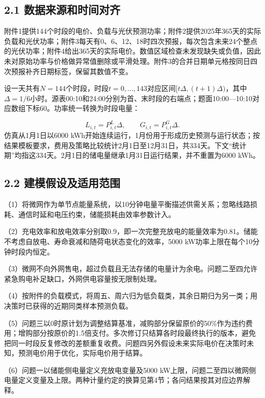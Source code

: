\documentclass[UTF8,a4paper,zihao=-4,fontset=windows]{ctexart}
\begin{document}
\subsection{2.1 数据来源和时间对齐}
附件1提供144个时段的电价、负载与光伏预测功率；附件2提供2025年365天的实际负载和光伏功率；附件3每天有0、6、12、18时四次预报，每次包含未来24个整点的光伏功率；附件4给出365天的实际电价。数值区域检查未发现缺失或负值，因此未对原始功率与价格做异常值删除或平滑处理。附件3的合并日期单元格按同日四次预报补齐日期标签，保留其数值不变。
\par
设一天共有$N=144$个时段，时段$t=0,\ldots,143$对应区间$[t\Delta,(t+1)\Delta)$，其中$\Delta=1/6$小时。源表00:10和24:00分别为首、末时段的右端点；题面10:00—10:10对应数组下标60。功率统一转换为时段电量：
\par
\begin{equation}
L_{i,t}=P^L_{i,t}\Delta,\qquad G_{i,t}=P^G_{i,t}\Delta. \tag{1}
\end{equation}
仿真从1月1日以6000 kWh开始连续运行，1月份用于形成历史预测与运行状态；按结果模板要求，费用及策略比较统计2月1日至12月31日，共334天。下文“统计期”均指这334天。2月1日的储电量继承1月31日运行结果，并不重置为6000 kWh。
\par
\subsection{2.2 建模假设及适用范围}
（1）将微网作为单节点能量系统，以10分钟电量平衡描述供需关系；忽略线路损耗、通信时延和电压约束，储能损耗由效率参数计入。
\par
（2）充电效率和放电效率分别取0.9，即一次完整充放电的能量效率为0.81。储能不考虑自放电、寿命衰减和随荷电状态变化的效率，5000 kW功率上限在每个10分钟时段内恒定。
\par
（3）微网不向外网售电，超过负载且无法存储的电量计为余电。问题二至四允许紧急购电补足缺口，外网供电容量按无限制处理。
\par
（4）按附件的负载模式，将周五、周六归为低负载类，其余日期归为另一类；用决策时已获得的近期同类样本预测负载。
\par
（5）问题三以0时原计划为调整结算基准，减购部分保留原价的50\%作为违约费用；增购部分按原价的1.5倍支付。多次修订只结算各时段最终执行的版本，避免把同一时段反复修改的差额重复收费。问题四另外假设未来实际电价在决策时未知，预测电价用于优化，实际电价用于结算。
\par
（6）问题一以储能侧电量定义充放电变量及5000 kW上限，问题二至四以微网侧电量定义变量及上限。两种计量约定的换算见第4节；各问结果按其对应边界解释。
\par
\end{document}
